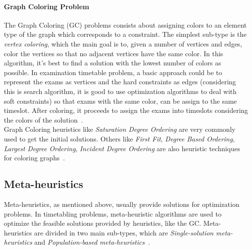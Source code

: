 \paragraph{Graph Coloring Problem}
The Graph Coloring (GC) problems consists about assigning colors to an element type of the graph which corresponds to a constraint. The simplest sub-type is the \textit{vertex coloring}, which the main goal is to, given a number of vertices and edges, color the vertices so that no adjacent vertices have the same color. In this algorithm, it's best to find a solution with the lowest number of colors as possible. In examination timetable problem, a basic approach could be to represent the exams as vertices and the hard constraints as edges (considering this is search algorithm, it is good to use optimization algorithms to deal with soft constraints) so that exams with the same color, can be assign to the same timeslot. After coloring, it proceeds to assign the exams into timeslots considering the colors of the solution~\cite{Qu2009}.\\

Graph Coloring heuristics like \textit{Saturation Degree Ordering} are very commonly used to get the initial solutions. Others like \textit{First Fit}, \textit{Degree Based Ordering}, \textit{Largest Degree Ordering}, \textit{Incident Degree Ordering} are also heuristic techniques for coloring graphs~\cite{Lee1996}.\\


\subsection{Meta-heuristics}
Meta-heuristics, as mentioned above, usually provide solutions for optimization problems. In timetabling problems, meta-heuristic algorithms are used to optimize the feasible solutions provided by heuristics, like the GC. Meta-heuristics are divided in two main sub-types, which are \textit{Single-solution meta-heuristics} and \textit{Population-based meta-heuristics}~\cite{Talbi2009}.\\

